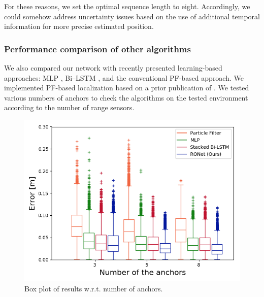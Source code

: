 \documentclass[letterpaper, 10 pt, conference]{ieeeconf}
\begin{document}
For these reasons, we set the optimal sequence length to eight. Accordingly, we could somehow address uncertainty issues based on the use of additional temporal information for more precise estimated position.






\subsubsection{Performance comparison of other algorithms}

We also compared our network with recently presented learning-based approaches: MLP \cite{kumar2016localization}, Bi--LSTM \cite{lim2018effective}, and the conventional PF-based approach\cite{gonzalez2009mobile, blanco2008pure}. We implemented PF-based localization based on a prior publication of \cite{gonzalez2009mobile}. We tested various numbers of anchors to check the algorithms on the tested environment according to the number of range sensors.

\begin{figure}[h]
	\centering
	\includegraphics[width=0.9\linewidth]{image/boxcompare}
	\caption{Box plot of results w.r.t. number of anchors.}
	\label{fig:box_plot} 	
\end{figure}
\end{document}
